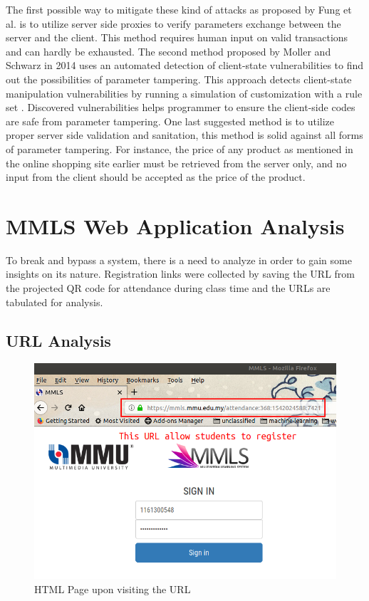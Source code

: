 \documentclass[runningheads]{llncs}
\begin{document}
The first possible way to mitigate these kind of attacks as proposed by Fung et al. is to utilize server side proxies to verify parameters exchange between the server and the client. This method requires human input on valid transactions and can hardly be exhausted. The second method proposed by Moller and Schwarz in 2014 uses an automated detection of client-state vulnerabilities to find out the possibilities of parameter tampering. This approach detects client-state manipulation vulnerabilities by running a simulation of customization with a rule set \cite{møller_schwarz_2014}. Discovered vulnerabilities helps programmer to ensure the client-side codes are safe from parameter tampering. One last suggested method is to utilize proper server side validation and sanitation, this method is solid against all forms of parameter tampering. For instance, the price of any product as mentioned in the online shopping site earlier must be retrieved from the server only, and no input from the client should be accepted as the price of the product.
%
%
\section{MMLS Web Application Analysis}
To break and bypass a system, there is a need to analyze in order to gain some insights on its nature. Registration links were collected by saving the URL from the projected QR code for attendance during class time and the URLs are tabulated for analysis. 

\subsection{URL Analysis}
%
%
\begin{figure}
\includegraphics[width=\textwidth]{imgres/standard0_edit1.png}
\caption{HTML Page upon visiting the URL} 
\label{fig:std0}
\centering
\end{figure}
\end{document}
